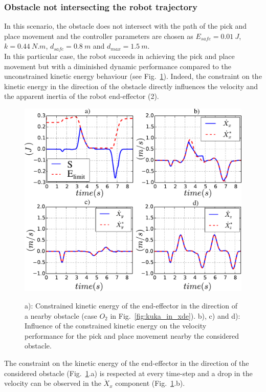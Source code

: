 \documentclass[a4paper, 10pt, conference]{ieeeconf}      %
\begin{document}
\subsubsection{Obstacle not intersecting the robot trajectory}
In this scenario, the obstacle does not intersect with the path of the pick and place movement and the controller parameters are chosen as $E_{safe} = 0.01~J$, $k = 0.44~N.m$, $d_{safe} = 0.8~m$ and $d_{max} = 1.5~m$.
\\
In this particular case, the robot succeeds in achieving the pick and place movement but with a diminished dynamic performance compared to the unconstrained kinetic energy behaviour (see Fig.~\ref{fig:vel_track_wO_wpC_wEc}). Indeed, the constraint on the kinetic energy in the direction of the obstacle directly influences the velocity and the apparent inertia of the robot end-effector (2).   
 
\begin{figure}[h]
\centering
{\includegraphics[width=0.9\columnwidth]{figures/vel_wO_wpC_wEc}}
\caption{a): Constrained kinetic energy of the end-effector in the direction of a nearby obstacle (case $O_2$ in Fig.~\ref{fig:kuka_in_xde}). b), c) and d): Influence of the constrained kinetic energy on the velocity performance for the  pick and place movement nearby the considered obstacle.} 
\label{fig:vel_track_wO_wpC_wEc}
\end{figure}

The constraint on the kinetic energy of the end-effector in the direction of the considered obstacle (Fig.~\ref{fig:vel_track_wO_wpC_wEc}.a) is respected at every time-step and a drop in the velocity  can be observed in the $\dot{X}_x$ component (Fig.~\ref{fig:vel_track_wO_wpC_wEc}.b).
\end{document}
